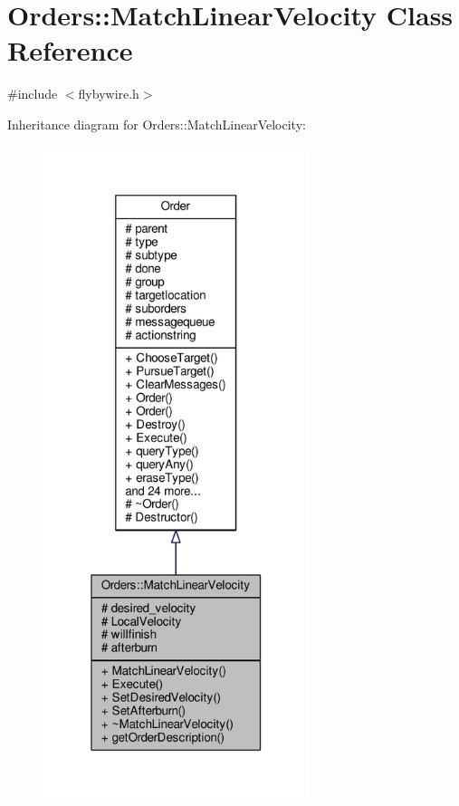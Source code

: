 \hypertarget{classOrders_1_1MatchLinearVelocity}{}\section{Orders\+:\+:Match\+Linear\+Velocity Class Reference}
\label{classOrders_1_1MatchLinearVelocity}


{\ttfamily \#include $<$flybywire.\+h$>$}



Inheritance diagram for Orders\+:\+:Match\+Linear\+Velocity\+:
\nopagebreak
\begin{figure}[H]
\begin{center}
\leavevmode
\includegraphics[width=220pt]{d4/dea/classOrders_1_1MatchLinearVelocity__inherit__graph}
\end{center}
\end{figure}


